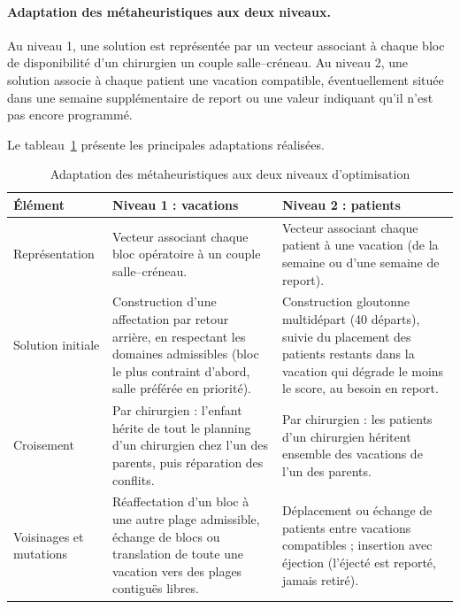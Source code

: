 \documentclass[11pt,a4paper]{article}
\begin{document}
\paragraph{Adaptation des métaheuristiques aux deux niveaux.}

Au niveau 1, une solution est représentée par un vecteur associant à chaque bloc de disponibilité d'un chirurgien un couple salle--créneau. Au niveau 2, une solution associe à chaque patient une vacation compatible, éventuellement située dans une semaine supplémentaire de report ou une valeur indiquant qu'il n'est pas encore programmé.

Le tableau~\ref{tab:adaptation_meta} présente les principales adaptations réalisées.

\begin{table}[htbp]
\centering
\footnotesize
\caption{Adaptation des métaheuristiques aux deux niveaux d'optimisation }
\label{tab:adaptation_meta}
\begin{tabularx}{\linewidth}{@{}p{2.3cm}XX@{}}
\toprule
\textbf{Élément} &
\textbf{Niveau 1 : vacations} &
\textbf{Niveau 2 : patients} \\
\midrule

Représentation &
Vecteur associant chaque bloc opératoire à un couple salle--créneau. &
Vecteur associant chaque patient à une vacation (de la semaine ou d'une semaine de report). \\

Solution initiale &
Construction d'une affectation par retour arrière, en respectant les domaines admissibles (bloc le plus contraint d'abord, salle préférée en priorité). &
Construction gloutonne multidépart (40 départs), suivie du placement des patients restants dans la vacation qui dégrade le moins le score, au besoin en report. \\

Croisement &
Par chirurgien : l'enfant hérite de tout le planning d'un chirurgien chez l'un des parents, puis réparation des conflits. &
Par chirurgien : les patients d'un chirurgien héritent ensemble des vacations de l'un des parents. \\

Voisinages et mutations &
Réaffectation d'un bloc à une autre plage admissible, échange de blocs ou translation de toute une vacation vers des plages contiguës libres. &
Déplacement ou échange de patients entre vacations compatibles ; insertion avec éjection (l'éjecté est reporté, jamais retiré). \\


\end{tabularx}
\end{table}
\end{document}
